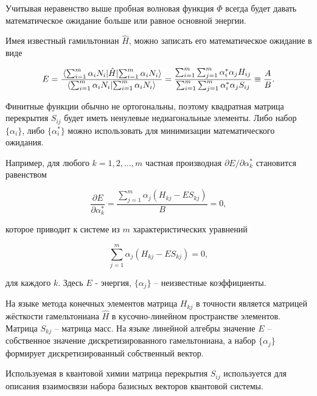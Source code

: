 Учитывая неравенство выше пробная волновая функция $\varPhi$ всегда будет давать математическое ожидание больше или равное основной энергии.

Имея известный гамильтониан $\hat{H}$, можно записать его математическое ожидание в виде

\begin{displaymath}
	E = \frac{\expval{\hat{H}}{\sum_{i=1}^{m} \alpha_{i} N_{i}}}{\bra{\sum_{i=1}^{m} \alpha_{i} N_{i}} \ket{\sum_{i=1}^{m} \alpha_{i} N_{i}} } = 
	\frac{\sum_{i=1}^{m} \sum_{j=1}^{m} \alpha_{i}^{*} \alpha_{j} H_{ij}}{\sum_{i=1}^{m} \sum_{j=1}^{m} \alpha_{i}^{*} \alpha_{j} S_{ij}} \equiv 
	\frac{A}{B}.
\end{displaymath}

Финитные функции обычно не ортогональны, поэтому квадратная матрица перекрытия $S_{ij}$ будет иметь ненулевые недиагональные элементы. 
Либо набор $\{ \alpha_{i} \}$, либо $\{ \alpha_{i}^{*} \}$ можно использовать для минимизации математического ожидания.

Например, для любого $k = 1, 2, \dots, m$ частная производная $\partial E / \partial \alpha_{k}^{*}$ становится равенством

\begin{displaymath}
	\frac{\partial E}{\partial \alpha_{k}^{*}} = \frac{\sum_{j=1}^{m} \alpha_{j} (H_{kj} - E S_{kj})}{B}= 0,
\end{displaymath}

\noindent которое приводит к системе из $m$ характеристических уравнений

\begin{displaymath}
	\sum_{j=1}^{m} \alpha_{j} (H_{kj} - E S_{kj}) = 0,
\end{displaymath}

\noindent для каждого $k$. Здесь $E$ - энергия, $\{ \alpha_{j} \}$ -- неизвестные коэффициенты.

На языке метода конечных элементов матрица $H_{kj}$ в точности является матрицей жёсткости гамельтониана $\hat{H}$ в кусочно-линейном пространстве элементов.
Матрица $S_{kj}$ -- матрица масс. На языке линейной алгебры значение $E$ -- собственное значение дискретизированного гамельтониана, а набор $\{ \alpha_{j} \}$  формирует дискретизированный собственный вектор.

\begin{info} %
	Используемая в квантовой химии матрица перекрытия $S_{ij}$ используется для описания взаимосвязи набора базисных векторов квантовой системы.
\end{info}

